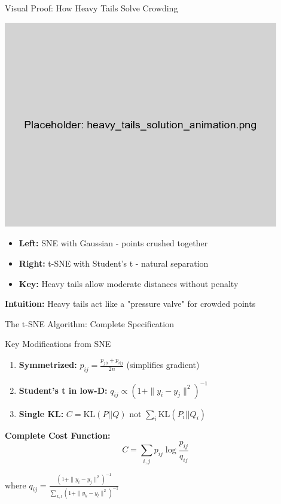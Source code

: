 \documentclass[aspectratio=169]{beamer}
\newcommand{\intuition}[1]{\colorbox{green!10}{\textcolor{intuitioncolor}{\textbf{Intuition:} #1}}}
\begin{document}
\begin{frame}{Visual Proof: How Heavy Tails Solve Crowding}
\begin{center}
\includegraphics[width=0.9\textwidth]{./Figures/heavy_tails_solution_animation.png}
\end{center}

\begin{itemize}
\item \textbf{Left:} SNE with Gaussian - points crushed together
\item \textbf{Right:} t-SNE with Student's t - natural separation
\item \textbf{Key:} Heavy tails allow moderate distances without penalty
\end{itemize}

\intuition{Heavy tails act like a "pressure valve" for crowded points}
\end{frame}

\begin{frame}{The t-SNE Algorithm: Complete Specification}
\begin{block}{Key Modifications from SNE}
\begin{enumerate}
\item \textbf{Symmetrized:} $p_{ij} = \frac{p_{j|i} + p_{i|j}}{2n}$ (simplifies gradient)
\item \textbf{Student's t in low-D:} $q_{ij} \propto (1 + \|y_i - y_j\|^2)^{-1}$
\item \textbf{Single KL:} $C = \text{KL}(P||Q)$ not $\sum_i \text{KL}(P_i||Q_i)$
\end{enumerate}
\end{block}

\textbf{Complete Cost Function:}
$$C = \sum_{i,j} p_{ij} \log\frac{p_{ij}}{q_{ij}}$$

where $q_{ij} = \frac{(1 + \|y_i - y_j\|^2)^{-1}}{\sum_{k,l} (1 + \|y_k - y_l\|^2)^{-1}}$
\end{frame}
\end{document}
